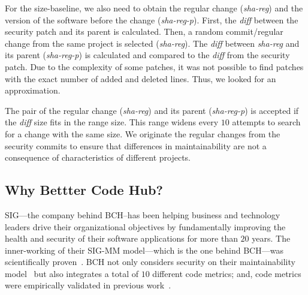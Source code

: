 \documentclass[smallextended]{svjour3}       %
\begin{document}
For the size-baseline, we also need to obtain the regular change (\emph{sha-reg})
and the version of the software before the change (\emph{sha-reg-p}). 
First, the \emph{diff}
between the security patch and its parent is calculated.
Then, a random commit/regular change from 
the same project is selected (\emph{sha-reg}). The 
\emph{diff} between \emph{sha-reg} and its parent (\emph{sha-reg-p})
is calculated and compared to the \emph{diff} from the security patch.
Due to the complexity of some patches, it was not possible 
to find patches with the exact number of added and deleted lines. 
Thus, we looked for an approximation.


The pair of the regular change (\emph{sha-reg}) and its parent (\emph{sha-reg-p}) is accepted if the 
\emph{diff} size fits in the range size. This range widens every 
$10$ attempts to search for a change with the same size. We 
originate the regular changes from the security commits to ensure 
that differences in maintainability are not a consequence of 
characteristics of different projects.


\subsection{Why Bettter Code Hub?}

SIG---the company behind BCH--has been helping business and technology 
leaders drive their organizational 
objectives by fundamentally improving the health and security of 
their software applications for more than $20$ years. The
inner-working of their SIG-MM model---which is the one behind BCH---was 
scientifically proven~\cite{4335232,5609747,6113040,baggen2012}.
BCH not only considers security on their maintainability model~\cite{6616351}
but also integrates a total of $10$ different code metrics; and, 
code metrics were empirically validated in previous 
work~\cite{Bijlsma:2012:FIR:2317098.2317124,8530041,8919169,8785997}.
\end{document}
